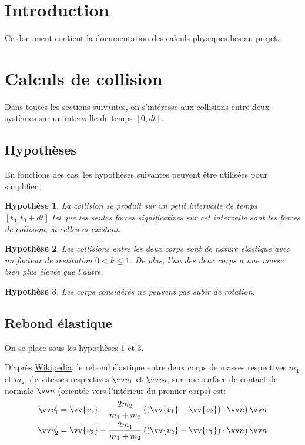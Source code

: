 \documentclass[a4paper]{article}
\newtheorem{hypothesis}{Hypothèse}
\begin{document}
\tableofcontents
\newpage

\section{Introduction}
Ce document contient la documentation des calculs physiques liés au projet.

\section{Calculs de collision}
Dans toutes les sections suivantes, on s'intéresse aux collisions entre deux systèmes sur un intervalle de temps $[0, dt]$.

\subsection{Hypothèses}
En fonctions des cas, les hypothèses suivantes peuvent être utilisées pour simplifier:
\begin{hypothesis}
  \label{hyp:neglect_external_forces}
  La collision se produit sur un petit intervalle de temps $[t_0,t_0+dt]$ tel que les seules forces significatives
  sur cet intervalle sont les forces de collision, si celles-ci existent.
\end{hypothesis}

\begin{hypothesis}
  \label{hyp:rebound_heavy_body}
  Les collisions entre les deux corps sont de nature élastique avec un facteur de restitution $0 < k \leq 1$.
  De plus, l'un des deux corps a une masse bien plus élevée que l'autre.
\end{hypothesis}

\begin{hypothesis}
  \label{hyp:no_rotation}
  Les corps considérés ne peuvent pas subir de rotation.
\end{hypothesis}



\subsection{Rebond élastique}
On se place sous les hypothèses \ref{hyp:neglect_external_forces} et \ref{hyp:no_rotation}.

D'après \href{https://en.wikipedia.org/wiki/Elastic_collision}{Wikipedia},
le rebond élastique entre deux corps de masses respectives $m_1$ et $m_2$,
de vitesses respectives $\vv v_1$ et $\vv v_2$,
sur une surface de contact de normale $\vv n$ (orientée vers l'intérieur du premier corps) est:
\begin{equation}
  \begin{aligned}
    \vv v_1' = \vv{v_1} - \frac{2m_2}{m_1 + m_2} \left((\vv{v_1} - \vv{v_2}) \cdot \vv n \right) \vv n \\
    \vv v_2' = \vv{v_2} + \frac{2m_1}{m_1 + m_2} \left((\vv{v_2} - \vv{v_1}) \cdot \vv n \right) \vv n
  \end{aligned}
\end{equation}
\end{document}
